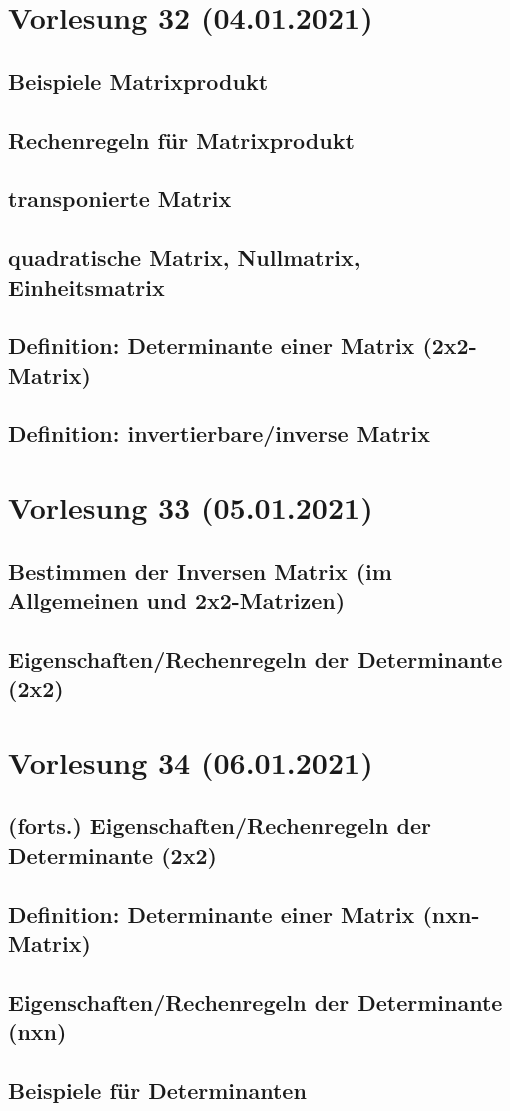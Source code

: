 \documentclass[]{article}
\begin{document}
\section{Vorlesung 32 (04.01.2021)}
\subsection{Beispiele Matrixprodukt}
\subsection{Rechenregeln für Matrixprodukt}
\subsection{transponierte Matrix}
\subsection{quadratische Matrix, Nullmatrix, Einheitsmatrix}
\subsection{Definition: Determinante einer Matrix (2x2-Matrix)}
\subsection{Definition: invertierbare/inverse Matrix}


\section{Vorlesung 33 (05.01.2021)}
\subsection{Bestimmen der Inversen Matrix (im Allgemeinen und 2x2-Matrizen)}
\subsection{Eigenschaften/Rechenregeln der Determinante (2x2)}


\section{Vorlesung 34 (06.01.2021)}
\subsection{(forts.) Eigenschaften/Rechenregeln der Determinante (2x2)}
\subsection{Definition: Determinante einer Matrix (nxn-Matrix)}
\subsection{Eigenschaften/Rechenregeln der Determinante (nxn)}
\subsection{Beispiele für Determinanten}

\end{document}
